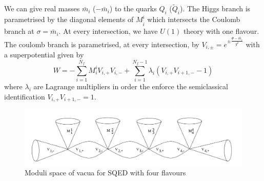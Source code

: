 We can give real masses $\bar{m}_i$ ($-\bar{m}_i$) to the quarks $Q_i$ ($\tilde{Q}_i$).
The Higgs branch is parametrised by the diagonal elements of $M^i_{\tilde{i}}$ which intersects the Coulomb branch at $\sigma = \bar{m}_i$.
At every intersection, we have $U(1)$ theory with one flavour.
The coulomb branch is parametrised, at every intersection, by $V_{i,\pm} = e^{\pm \frac{\Phi - \bar{m}_i}{g^2}} $ with a superpotential given by
\begin{equation}
W = - \sum_{i = 1}^{N_f} M^i_i V_{i,+} V_{i,-} + \sum_{i=1}^{N_f - 1} \lambda_i \left(    V_{i,+} V_{i+1,-} - 1\right)
\end{equation}
where $\lambda_i$ are Lagrange multipliers in order the enforce the semiclassical identification  $ V_{i,+} V_{i+1,-} = 1 $.

\begin{figure}[h!]
\centering
\includegraphics[scale=0.5]{u1_moduli_space_flavours.png}
\caption{Moduli space of vacua for SQED with four flavours}
\end{figure}


